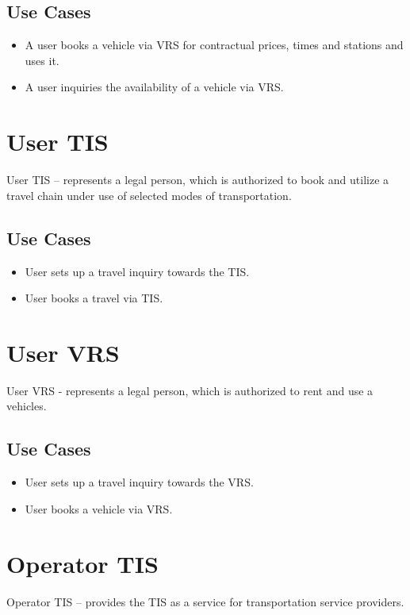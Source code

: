 \subsection*{Use Cases}
\begin{itemize}
\item A user books a vehicle via VRS for contractual prices, times and stations and uses it.
\item A user inquiries the availability of a vehicle via VRS. 
\end{itemize}

\section*{User TIS}
User TIS – represents a legal person, which is authorized to book and utilize a travel chain under use of selected modes of transportation.

\subsection*{Use Cases}
\begin{itemize}
\item User sets up a travel inquiry towards the TIS.
\item User books a travel via TIS.
\end{itemize}

\section*{User VRS}
User VRS - represents a legal person, which is authorized to rent and use a vehicles.

\subsection*{Use Cases}
\begin{itemize}
\item User sets up a travel inquiry towards the VRS.
\item User books a vehicle via VRS.
\end{itemize}

\section*{Operator TIS}
Operator TIS – provides the TIS as a service for transportation service providers.



